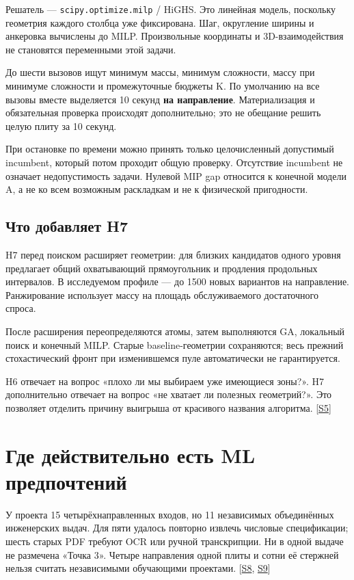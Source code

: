 \documentclass[11pt,a4paper]{article}
\begin{document}
Решатель — {\small\nolinkurl{scipy.optimize.milp}} / HiGHS. Это линейная модель, поскольку геометрия каждого столбца уже фиксирована. Шаг, округление ширины и анкеровка вычислены до MILP. Произвольные координаты и 3D-взаимодействия не становятся переменными этой задачи.


До шести вызовов ищут минимум массы, минимум сложности, массу при минимуме сложности и промежуточные бюджеты K. По умолчанию на все вызовы вместе выделяется 10 секунд \textbf{на направление}. Материализация и обязательная проверка происходят дополнительно; это не обещание решить целую плиту за 10 секунд.


При остановке по времени можно принять только целочисленный допустимый incumbent, который потом проходит общую проверку. Отсутствие incumbent не означает недопустимость задачи. Нулевой MIP gap относится к конечной модели A, а не ко всем возможным раскладкам и не к физической пригодности.


\subsection{Что добавляет H7}

H7 перед поиском расширяет геометрии: для близких кандидатов одного уровня предлагает общий охватывающий прямоугольник и продления продольных интервалов. В исследуемом профиле — до 1500 новых вариантов на направление. Ранжирование использует массу на площадь обслуживаемого достаточного спроса.


После расширения переопределяются атомы, затем выполняются GA, локальный поиск и конечный MILP. Старые baseline-геометрии сохраняются; весь прежний стохастический фронт при изменившемся пуле автоматически не гарантируется.


H6 отвечает на вопрос «плохо ли мы выбираем уже имеющиеся зоны?». H7 дополнительно отвечает на вопрос «не хватает ли полезных геометрий?». Это позволяет отделить причину выигрыша от красивого названия алгоритма. {\color{Teal}\small[\hyperlink{S5}{S5}]}


\section{Где действительно есть ML предпочтений}

У проекта 15 четырёхнаправленных входов, но 11 независимых объединённых инженерских выдач. Для пяти удалось повторно извлечь числовые спецификации; шесть старых PDF требуют OCR или ручной транскрипции. Ни в одной выдаче не размечена «Точка 3». Четыре направления одной плиты и сотни её стержней нельзя считать независимыми обучающими проектами. {\color{Teal}\small[\hyperlink{S8}{S8}, \hyperlink{S9}{S9}]}
\end{document}
